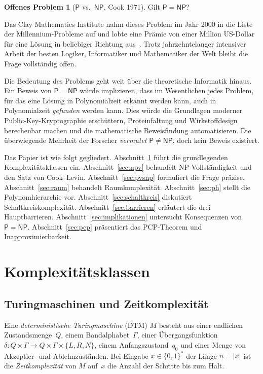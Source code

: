 \documentclass[12pt,a4paper]{amsart}
\theoremstyle{definition}
\newtheorem{openproblem}[theorem]{Offenes Problem}
\newcommand{\Pclass}{\mathsf{P}}
\newcommand{\NP}{\mathsf{NP}}
\begin{document}
\begin{openproblem}[$\Pclass$ vs.\ $\NP$, Cook 1971]
Gilt $\Pclass = \NP$?
\end{openproblem}

Das Clay Mathematics Institute nahm dieses Problem im Jahr 2000 in die Liste
der Millennium-Probleme auf und lobte eine Prämie von einer Million US-Dollar
für eine Lösung in beliebiger Richtung aus~\cite{smale1998}.  Trotz jahrzehntelanger
intensiver Arbeit der besten Logiker, Informatiker und Mathematiker der Welt
bleibt die Frage vollständig offen.

Die Bedeutung des Problems geht weit über die theoretische Informatik hinaus.
Ein Beweis von $\Pclass = \NP$ würde implizieren, dass im Wesentlichen jedes
Problem, für das eine Lösung in Polynomialzeit erkannt werden kann, auch in
Polynomialzeit \emph{gefunden} werden kann.  Dies würde die Grundlagen moderner
Public-Key-Kryptographie erschüttern, Proteinfaltung und Wirkstoffdesign
berechenbar machen und die mathematische Beweisfindung automatisieren.
Die überwiegende Mehrheit der Forscher \emph{vermutet} $\Pclass \neq \NP$,
doch kein Beweis existiert.

Das Papier ist wie folgt gegliedert.  Abschnitt~\ref{sec:klassen} führt die
grundlegenden Komplexitätsklassen ein.  Abschnitt~\ref{sec:npv} behandelt
NP-Vollständigkeit und den Satz von Cook--Levin.
Abschnitt~\ref{sec:pvsnp} formuliert die Frage präzise.
Abschnitt~\ref{sec:raum} behandelt Raumkomplexität.
Abschnitt~\ref{sec:ph} stellt die Polynomhierarchie vor.
Abschnitt~\ref{sec:schaltkreis} diskutiert Schaltkreiskomplexität.
Abschnitt~\ref{sec:barrieren} erläutert die drei Hauptbarrieren.
Abschnitt~\ref{sec:implikationen} untersucht Konsequenzen von $\Pclass = \NP$.
Abschnitt~\ref{sec:pcp} präsentiert das PCP-Theorem und Inapproximierbarkeit.

\section{Komplexitätsklassen}
\label{sec:klassen}

\subsection{Turingmaschinen und Zeitkomplexität}

Eine \emph{deterministische Turingmaschine} (DTM) $M$ besteht aus einer
endlichen Zustandsmenge~$Q$, einem Bandalphabet~$\Gamma$, einer
Übergangsfunktion
$\delta\colon Q\times\Gamma\to Q\times\Gamma\times\{L,R,N\}$,
einem Anfangszustand~$q_0$ und einer Menge von Akzeptier- und
Ablehnzuständen.  Bei Eingabe $x\in\{0,1\}^*$ der Länge $n=|x|$ ist die
\emph{Zeitkomplexität} von $M$ auf~$x$ die Anzahl der Schritte bis zum Halt.
\end{document}
